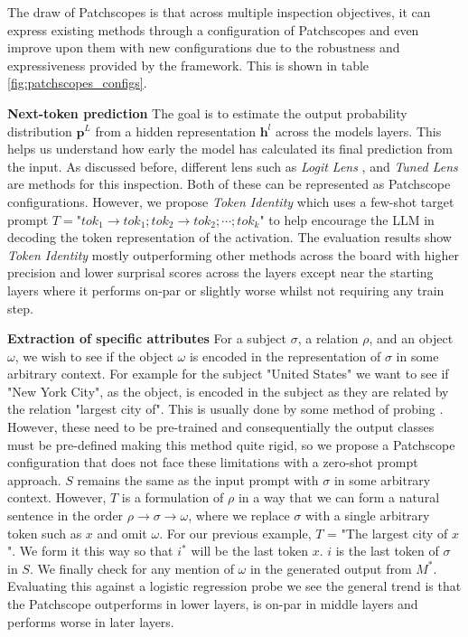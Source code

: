 The draw of Patchscopes is that across multiple inspection objectives, it can express existing methods through a configuration of Patchscopes and even improve upon them with new configurations due to the robustness and expressiveness provided by the framework. This is shown in table \ref{fig:patchscopes_configs}.

\textbf{Next-token prediction} The goal is to estimate the output probability distribution $\bm{p}^L$ from a hidden representation $\bm{h}^l$ across the models layers. This helps us understand how early the model has calculated its final prediction from the input. As discussed before, different lens such as \textit{Logit Lens} \cite{nostalgebraist_interpreting_2020}, and \textit{Tuned Lens} \cite{belrose_eliciting_2023} are methods for this inspection. Both of these can be represented as Patchscope configurations. However, we propose \textit{Token Identity} which uses a few-shot target prompt $T=\text{"}tok_1\xrightarrow{}tok_1;tok_2\xrightarrow{}tok_2;\dotsi;tok_k\text{"}$ to help encourage the LLM in decoding the token representation of the activation. The evaluation results show \textit{Token Identity} mostly outperforming other methods across the board with higher precision and lower surprisal scores across the layers except near the starting layers where it performs on-par or slightly worse whilst not requiring any train step.

\textbf{Extraction of specific attributes}
For a subject $\sigma$, a relation $\rho$, and an object $\omega$, we wish to see if the object $\omega$ is encoded in the representation of $\sigma$ in some arbitrary context. For example for the subject "United States" we want to see if "New York City", as the object, is encoded in the subject as they are related by the relation "largest city of". This is usually done by some method of probing \cite{belinkov_probing_2022}. However, these need to be pre-trained and consequentially the output classes must be pre-defined making this method quite rigid, so we propose a Patchscope configuration that does not face these limitations with a zero-shot prompt approach. $S$ remains the same as the input prompt with $\sigma$ in some arbitrary context. However, $T$ is a formulation of $\rho$ in a way that we can form a natural sentence in the order $\rho \xrightarrow{} \sigma \xrightarrow{} \omega$, where we replace $\sigma$ with a single arbitrary token such as $x$ and omit $\omega$. For our previous example, $T$ = "The largest city of $x$". We form it this way so that $i^*$ will be the last token $x$. $i$ is the last token of $\sigma$ in $S$. We finally check for any mention of $\omega$ in the generated output from $M^*$. Evaluating this against a logistic regression probe \cite{kohn_whats_2015, gupta_distributional_2015} we see the general trend is that the Patchscope outperforms in lower layers, is on-par in middle layers and performs worse in later layers.

